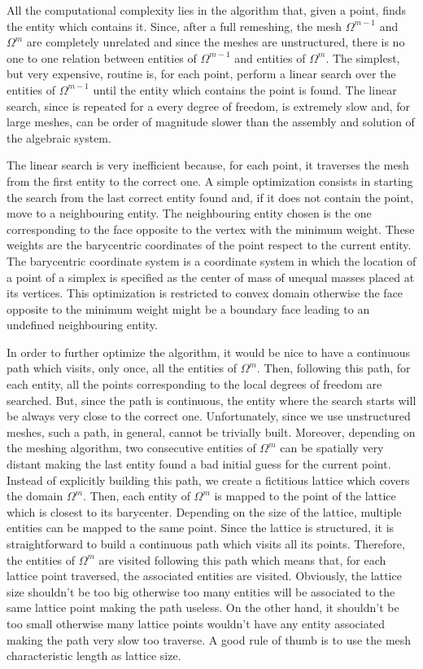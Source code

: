 All the computational complexity lies in the algorithm that, given a point,
finds the entity which contains it. Since, after a full remeshing, the mesh
$\Omega^{m-1}$ and $\Omega^m$ are completely unrelated and since the meshes are
unstructured, there is no one to one relation between entities of $\Omega^{m-1}$
and entities of $\Omega^m$. The simplest, but very expensive, routine is, for
each point, perform a linear search over the entities of $\Omega^{m-1}$ until
the entity which contains the point is found. The linear search, since is
repeated for a every degree of freedom, is extremely slow and, for large
meshes, can be order of magnitude slower than the assembly and solution of the
algebraic system.

The linear search is very inefficient because, for each point, it traverses the
mesh from the first entity to the correct one. A simple optimization consists in
starting the search from the last correct entity found and, if it does not
contain the point, move to a neighbouring entity. The neighbouring entity chosen
is the one corresponding to the face opposite to the vertex with the minimum
weight. These weights are the barycentric coordinates of the point respect to
the current entity. The barycentric coordinate system is a coordinate system in
which the location of a point of a simplex is specified as the center of mass
of unequal masses placed at its vertices. This optimization is restricted to
convex domain otherwise the face opposite to the minimum weight might be a
boundary face leading to an undefined neighbouring entity.

In order to further optimize the algorithm, it would be nice to have a
continuous path which visits, only once, all the entities of $\Omega^m$.
Then, following this path, for each entity, all the points corresponding to
the local degrees of freedom are searched. But, since the path is continuous,
the entity where the search starts will be always very close to the correct one.
Unfortunately, since we use unstructured meshes, such a path, in general,
cannot be trivially built. Moreover, depending on the meshing algorithm, two
consecutive entities of $\Omega^m$ can be spatially very distant making the
last entity found a bad initial guess for the current point. Instead of
explicitly building this path, we create a fictitious lattice which covers the
domain $\Omega^m$. Then, each entity of $\Omega^m$ is mapped to the point of the
lattice which is closest to its barycenter. Depending on the size of the
lattice, multiple entities can be mapped to the same point. Since the
lattice is structured, it is straightforward to build a continuous path which
visits all its points. Therefore, the entities of $\Omega^m$ are visited
following this path which means that, for each lattice point traversed, the
associated entities are visited. Obviously, the lattice size shouldn't be too
big otherwise too many entities will be associated to the same lattice point
making the path useless. On the other hand, it shouldn't be too small otherwise
many lattice points wouldn't have any entity associated making the path very
slow too traverse. A good rule of thumb is to use the mesh characteristic
length as lattice size.